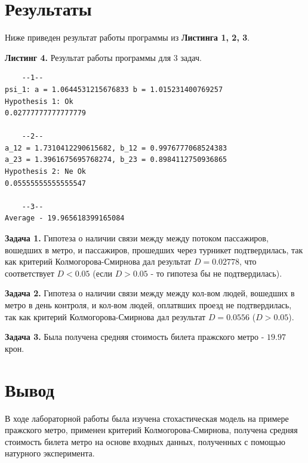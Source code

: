 \documentclass[a4paper, 12pt]{article}   	%
\begin{document}
\newpage
\section{Результаты}
    Ниже приведен результат работы программы из \textbf{Листинга 1, 2, 3}.
    
    \noindent\textbf{Листинг 4.} Результат работы программы для 3 задач.
\begin{verbatim}
    --1--
psi_1: a = 1.0644531215676833 b = 1.015231400769257
Hypothesis 1: Ok
0.02777777777777779

	--2--
a_12 = 1.7310412290615682, b_12 = 0.9976777068524383
a_23 = 1.3961675695768274, b_23 = 0.8984112750936865
Hypothesis 2: Ne Ok
0.05555555555555547

	--3--
Average - 19.965618399165084
\end{verbatim}
    
   \textbf{Задача 1.}
   Гипотеза о наличии связи между между потоком пассажиров, вошедших в метро, и пассажиров, прошедших через турникет подтвердилась, так как критерий Колмогорова-Смирнова дал результат $D = 0.02778$, что соответствует $D < 0.05$ (если $D > 0.05$ - то гипотеза бы не подтвердилась). 
   
   \textbf{Задача 2.}
   Гипотеза о наличии связи между между кол-вом людей, вошедших в метро в день контроля, и кол-вом людей, оплатвших проезд не подтвердилась, так как критерий Колмогорова-Смирнова дал результат $D = 0.0556$ ($D > 0.05$).
   
   \textbf{Задача 3.}
   Была получена средняя стоимость билета пражского метро - $19.97$ крон.


\newpage
\section{Вывод}
    В ходе лабораторной работы была изучена стохастическая модель на примере пражского метро, применен критерий Колмогорова-Смирнова, получена средняя стоимость билета метро на основе входных данных, полученных с помощью натурного эксперимента. 
\end{document}
